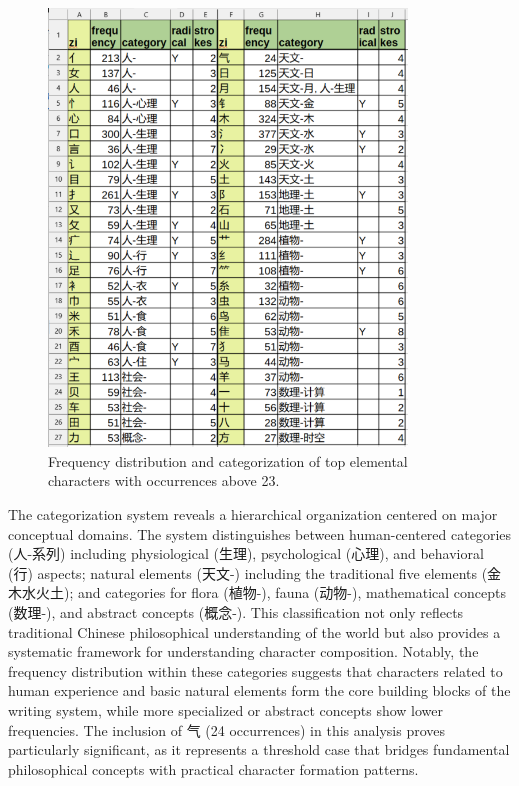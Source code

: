 \documentclass[11pt,letterpaper]{article}
\begin{document}
\begin{figure}
\centering
\includegraphics[width=0.85\textwidth]{./images/top-elemental-zi-ENU.png}
\caption{Frequency distribution and categorization of top elemental
characters with occurrences above 23.}
\end{figure}

The categorization system reveals a hierarchical organization centered
on major conceptual domains. The system distinguishes between
human-centered categories (人-系列) including physiological (生理),
psychological (心理), and behavioral (行) aspects; natural elements
(天文-) including the traditional five elements (金木水火土); and
categories for flora (植物-), fauna (动物-), mathematical concepts
(数理-), and abstract concepts (概念-). This classification not only
reflects traditional Chinese philosophical understanding of the world
but also provides a systematic framework for understanding character
composition. Notably, the frequency distribution within these categories
suggests that characters related to human experience and basic natural
elements form the core building blocks of the writing system, while more
specialized or abstract concepts show lower frequencies. The inclusion
of 气 (24 occurrences) in this analysis proves particularly significant,
as it represents a threshold case that bridges fundamental philosophical
concepts with practical character formation patterns.
\end{document}

